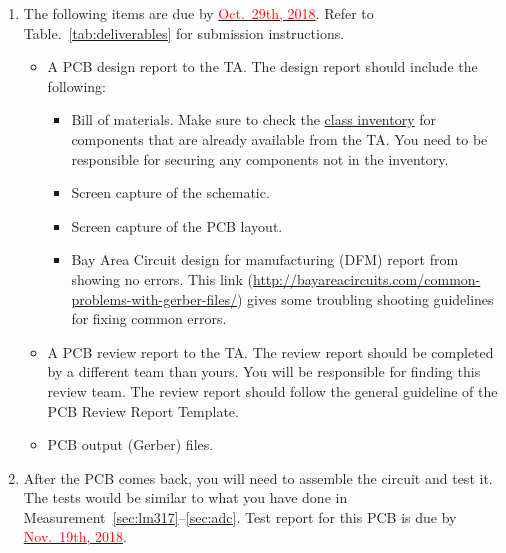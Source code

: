 \documentclass[letterpaper, 11pt]{article}
\newcommand{\due}[1]{\href{https://github.com/ucdart/UCD-EEC134/blob/master/support/schedule/eec134-schedule.pdf}{\textcolor{red}{#1}}}
\begin{document}
\begin{enumerate}
	\item The following items are due by \due{Oct.~29th, 2018}. Refer to Table.~\ref{tab:deliverables} for submission instructions. 
		\begin{itemize}
			\item A PCB design report to the TA. The design report should include the following:
				\begin{itemize}
					\item Bill of materials. Make sure to check the \href{https://docs.google.com/spreadsheets/d/1GJnBLUymuVzXjrK0Zkdbc2lwTbw0z9a0JR4bLLzO-Sw/edit#gid=4}{class inventory} for components that are already available from the TA. You need to be responsible for securing any components not in the inventory. 
					\item Screen capture of the schematic.
					\item Screen capture of the PCB layout.
					\item Bay Area Circuit design for manufacturing (DFM) report from showing no errors. This link (\url{http://bayareacircuits.com/common-problems-with-gerber-files/}) gives some troubling shooting guidelines for fixing common errors. 
				\end{itemize}
			\item A PCB review report to the TA. The review report should be completed by a different team than yours. You will be responsible for finding this review team. The review report should follow the general guideline of the PCB Review Report Template.

			\item PCB output (Gerber) files.
		\end{itemize}

	\item After the PCB comes back, you will need to assemble the circuit and test it. The tests would be similar to what you have done in Measurement~\ref{sec:lm317}--\ref{sec:adc}. Test report for this PCB is due by \due{Nov.~19th, 2018}.
\end{enumerate}


%
%
\end{document}
